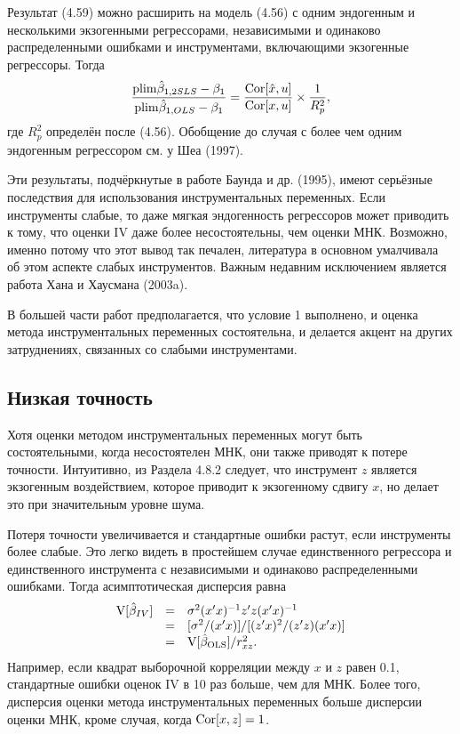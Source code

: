 Результат (4.59) можно расширить на модель (4.56) с одним эндогенным и несколькими экзогенными регрессорами, независимыми и одинаково распределенными ошибками и инструментами, включающими экзогенные регрессоры. Тогда
\begin{equation}
\frac{\mathrm{plim } \hat{\beta}_{1, 2SLS}-\beta_1}{\mathrm{plim } \hat{\beta}_{1, OLS}-\beta_1}
=\frac{\mathrm{Cor}[\hat{x},u]}{\mathrm{Cor}[x,u]}\times \frac{1}{R_p^2},
\end{equation}
где $R_p^2$ определён после (4.56). Обобщение до случая с более чем одним эндогенным регрессором см. у Шеа (1997).

Эти результаты, подчёркнутые в работе Баунда и др. (1995), имеют серьёзные последствия для использования инструментальных переменных. Если инструменты слабые, то даже мягкая эндогенность регрессоров может приводить к тому, что оценки IV даже более несостоятельны, чем оценки МНК. Возможно, именно потому что этот вывод так печален, литература в основном умалчивала об этом аспекте слабых инструментов. Важным недавним исключением является работа Хана и Хаусмана (2003a).

В большей части работ предполагается, что условие 1 выполнено, и оценка метода инструментальных переменных состоятельна, и делается акцент на других затруднениях, связанных со слабыми инструментами.

\subsection{Низкая точность}

Хотя оценки методом инструментальных переменных могут быть состоятельными, когда несостоятелен МНК, они также приводят к потере точности. Интуитивно, из Раздела 4.8.2 следует, что инструмент $z$ является экзогенным воздействием, которое приводит к экзогенному сдвигу $x$, но делает это при значительным уровне шума. 

Потеря точности увеличивается и стандартные ошибки растут, если инструменты  более слабые. Это легко видеть в простейшем случае единственного регрессора и единственного инструмента с независимыми и одинаково распределенными ошибками. Тогда асимптотическая дисперсия равна
\begin{equation}
\begin{array}{rcl}
\mathrm{V}[\hat{\beta}_{IV}]& = & \sigma^2 (x'x)^{-1}z'z(x'x)^{-1} \\
 & = & [ \sigma^2 / (x'x)]/[(z'x)^2/(z'z)(x'x)] \\
 & = & \mathrm{V} [\hat{\beta}_{\text{OLS}}]/r^2_{xz}. \\
\end{array}
\end{equation}
Например, если квадрат выборочной корреляции между $x$ и $z$ равен 0.1, стандартные ошибки оценок IV в 10 раз больше, чем для МНК. Более того, дисперсия оценки метода инструментальных переменных больше дисперсии оценки МНК, кроме случая, когда $\mathrm{Cor}[x,z]=1$.

